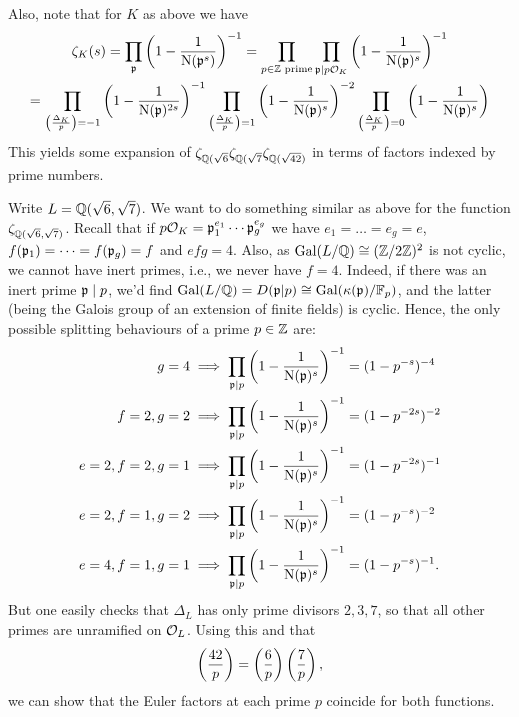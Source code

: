 \documentclass[a4paper,11pt]{article}
\begin{document}
Also, note that for $K$ as above we have
\begin{multline*}
    \zeta_K(s) = \prod_{\mathfrak{p}} \left( 1 - \frac{1}{\operatorname{N}(\mathfrak{p}^s)} \right)^{-1}  = 
    \prod_{p \in \mathbb{Z} \text{ prime}} \prod_{\mathfrak{p} \mid p \mathcal{O}_K} \left(1-
    \frac1{\operatorname{N}(\mathfrak{p})^s}\right)^{-1} \\
    = \prod_{\left( \frac{\Delta_K}{p} \right) = -1}\left( 1 - \frac{1}{\operatorname{N}(\mathfrak{p})^{2s}}\right)^{-1}
        \prod_{\left( \frac{\Delta_K}{p} \right) = 1}\left( 1 - \frac{1}{\operatorname{N}(\mathfrak{p})^{s}}\right)^{-2}
        \prod_{\left( \frac{\Delta_K}{p} \right) = 0}\left( 1 - \frac{1}{\operatorname{N}(\mathfrak{p})^{s}}\right)
\end{multline*}
This yields some expansion of $\zeta_{\mathbb{Q}(\sqrt 6} \zeta_{\mathbb{Q}(\sqrt 7}
\zeta_{\mathbb{Q}(\sqrt {42})}$ in terms of factors indexed by prime numbers.

Write $L = \mathbb{Q}(\sqrt 6, \sqrt 7)$. We want to do something similar as above for the
function $\zeta_{\mathbb{Q}(\sqrt 6, \sqrt 7)}$. Recall that if $p \mathcal{O}_K = \mathfrak{p}_1^{e_1} \cdots
\mathfrak{p}_g^{e_g}$ we have $e_1 = \dots = e_g = e$, $f(\mathfrak{p}_1) = \dots = f(\mathfrak{p}_g) = f$ and
$efg = 4$. Also, as $\operatorname{Gal}(L/\mathbb{Q}) \cong (\mathbb{Z}/2\mathbb{Z})^2$ is not cyclic, we cannot have 
inert primes, i.e., we never have $f=4$. Indeed, if there was an inert prime $\mathfrak{p} \mid p$,
we'd find $\operatorname{Gal}(L/\mathbb{Q}) = D(\mathfrak{p}|p) \cong \operatorname{Gal}(\kappa(\mathfrak{p})/\mathbb{F}_p)$, and the latter 
(being the Galois group of an extension of finite fields) is cyclic. 
Hence, the only possible splitting behaviours of a prime $p \in \mathbb{Z}$ are:
\begin{equation*}
    \begin{aligned}
        g = 4 &\implies \prod_{\mathfrak{p} \mid p}\left(1 - \frac1{\operatorname{N}(\mathfrak{p})^s}\right)^{-1} = (1 - p^{-s})^{-4} \\
        f = 2, g = 2 &\implies \prod_{\mathfrak{p} \mid p}\left(1 - \frac1{\operatorname{N}(\mathfrak{p})^s}\right)^{-1} = (1 - p^{-2s})^{-2} \\
        e = 2, f = 2, g = 1 &\implies \prod_{\mathfrak{p} \mid p}\left(1 - \frac1{\operatorname{N}(\mathfrak{p})^s}\right)^{-1} = (1 - p^{-2s})^{-1} \\
        e = 2, f = 1, g = 2 &\implies \prod_{\mathfrak{p} \mid p}\left(1 - \frac1{\operatorname{N}(\mathfrak{p})^s}\right)^{-1} = (1 - p^{-s})^{-2} \\
        e = 4, f = 1, g = 1 &\implies \prod_{\mathfrak{p} \mid p}\left(1 - \frac1{\operatorname{N}(\mathfrak{p})^s}\right)^{-1} = (1 - p^{-s})^{-1}.
    \end{aligned}
\end{equation*}
But one easily checks that $\Delta_L$ has only prime divisors $2,3,7$, so that all other
primes are unramified on $\mathcal{O}_L$. Using this and that
\begin{equation*}
    \left( \frac{42}{p} \right)= \left( \frac{6}{p} \right) \left( \frac{7}{p} \right),
\end{equation*}
we can show that the Euler factors at each prime $p$ coincide for both functions.
\end{document}
